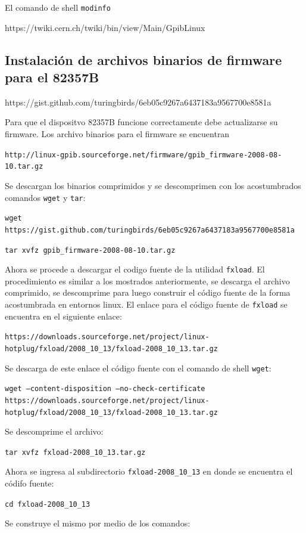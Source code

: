 \documentclass[paper=letter,oneside,fontsize=11pt]{article}
\begin{document}
		El comando de shell \texttt{modinfo} 
		
		https://twiki.cern.ch/twiki/bin/view/Main/GpibLinux
		
		\subsection{Instalación de archivos binarios de firmware para el 82357B}
		
		https://gist.github.com/turingbirds/6eb05c9267a6437183a9567700e8581a
		
		Para que el dispositvo 82357B funcione correctamente debe actualizarse su firmware. Los archivo binarios para el firmware se encuentran 
		
		\texttt{http://linux-gpib.sourceforge.net/firmware/gpib\_firmware-2008-08-10.tar.gz}
		
		Se descargan los binarios comprimidos y se descomprimen con los acostumbrados comandos \texttt{wget} y \texttt{tar}:
		
		\texttt{wget 		https://gist.github.com/turingbirds/6eb05c9267a6437183a9567700e8581a}
		
		\texttt{tar xvfz gpib\_firmware-2008-08-10.tar.gz}
		
		Ahora se procede a descargar el codigo fuente de la utilidad \texttt{fxload}. El procedimiento es similar a los mostrados anteriormente, se descarga el archivo comprimido, se descomprime para luego construir el código fuente de la forma acostumbrada en entornos linux. El enlace para el código fuente de \texttt{fxload} se encuentra en el siguiente enlace:
		
		\texttt{https://downloads.sourceforge.net/project/linux-hotplug/fxload/2008\_10\_13/fxload-2008\_10\_13.tar.gz}
		
		Se descarga de este enlace el código fuente con el comando de shell \texttt{wget}:
		
		\texttt{wget --content-disposition --no-check-certificate https://downloads.sourceforge.net/project/linux-hotplug/fxload/2008\_10\_13/fxload-2008\_10\_13.tar.gz}
		
		Se descomprime el archivo:
		
		\texttt{tar xvfz fxload-2008\_10\_13.tar.gz}
		
		Ahora se ingresa al subdirectorio \texttt{fxload-2008\_10\_13} en donde se encuentra el códifo fuente:
		
		\texttt{cd fxload-2008\_10\_13}
		
		Se construye el mismo por medio de los comandos:
		
\end{document}
